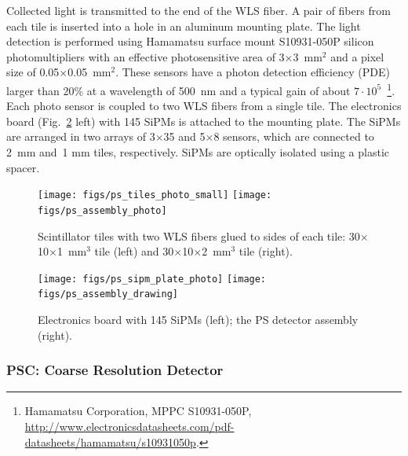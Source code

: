 Collected light is transmitted to the end of the WLS fiber. A pair of
fibers from each tile is inserted into a hole in an aluminum mounting
plate. %
The light detection is performed using Hamamatsu
surface mount S10931-050P silicon photomultipliers with an effective
photosensitive area of 3$\times$3~mm$^2$ and a pixel size of 0.05$\times$0.05~mm$^2$.
These sensors have a photon detection efficiency (PDE) larger
than 20\% at a wavelength of 500~nm and a typical gain of about
$7\cdot{}10^5$~\footnote{
 Hamamatsu Corporation, MPPC S10931-050P, 
 \url{http://www.electronicsdatasheets.com/pdf-datasheets/hamamatsu/s10931050p}.
}.
Each photo sensor is coupled to two WLS fibers
from a single tile.
The electronics board (Fig.~\ref{fig:beam:ps-electr-assemb} left) 
with 145 SiPMs is attached
to the mounting plate.
The SiPMs are arranged in two arrays
of 3$\times$35 and 5$\times$8 sensors, which are connected to 2~mm and~1 mm
tiles, respectively. SiPMs are optically isolated using a plastic
spacer.



\begin{figure}[h]
\begin{center}
   \texttt{[image: figs/ps\_tiles\_photo\_small]}\hspace{0.05\linewidth}%
   \texttt{[image: figs/ps\_assembly\_photo]}
\end{center}
\caption{Scintillator tiles with two WLS fibers glued to sides of each tile: 30$\times$10$\times$1~mm$^3$ tile (left) 
         and 30$\times$10$\times$2~mm$^3$  tile (right).
        }
\label{fig:beam:ps-tiles} 
\end{figure}

\begin{figure}[h]
\begin{center}
   \texttt{[image: figs/ps\_sipm\_plate\_photo]}\hspace{0.05\linewidth}%
   \texttt{[image: figs/ps\_assembly\_drawing]}
\end{center}
\caption{Electronics board with 145 SiPMs (left); 
         the PS detector assembly (right).
        }
\label{fig:beam:ps-electr-assemb} 
\end{figure}

\subsubsection[PSC: Coarse Resolution Detector]{PSC: Coarse Resolution Detector
  \label{sec:beamline:ps-coarse} }



